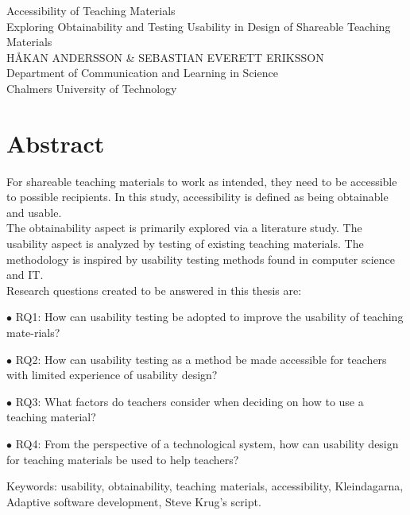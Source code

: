 Accessibility of Teaching Materials\\
Exploring Obtainability and Testing Usability in Design of Shareable Teaching Materials\\
HÅKAN ANDERSSON \& SEBASTIAN EVERETT ERIKSSON\\
Department of Communication and Learning in Science\\
Chalmers University of Technology \setlength{\parskip}{0.5cm}

\thispagestyle{plain}			%
\setlength{\parskip}{0pt plus 1.0pt}
\section*{Abstract}
For shareable teaching materials to work as intended, they need to be accessible to possible recipients. In this study, accessibility is defined as being obtainable and usable. \\[0.5cm]
The obtainability aspect is primarily explored via a literature study. The usability aspect is analyzed by testing of existing teaching materials. The methodology is inspired by usability testing methods found in computer science and IT. \\[0.5cm]
Research questions created to be answered in this thesis are:
\begin{description}
    \item $\bullet$ RQ1: How can usability testing be adopted to improve the usability of teaching mate-rials?
    \item $\bullet$ RQ2: How can usability testing as a method be made accessible for teachers with limited experience of usability design?
    \item $\bullet$ RQ3: What factors do teachers consider when deciding on how to use a teaching material?
    \item $\bullet$ RQ4: From the perspective of a technological system, how can usability design for teaching materials be used to help teachers?
\end{description}


\vfill
Keywords: usability, obtainability, teaching materials, accessibility, Kleindagarna, Adaptive software development, Steve Krug's script.

\newpage				%
\thispagestyle{empty}
\mbox{}
